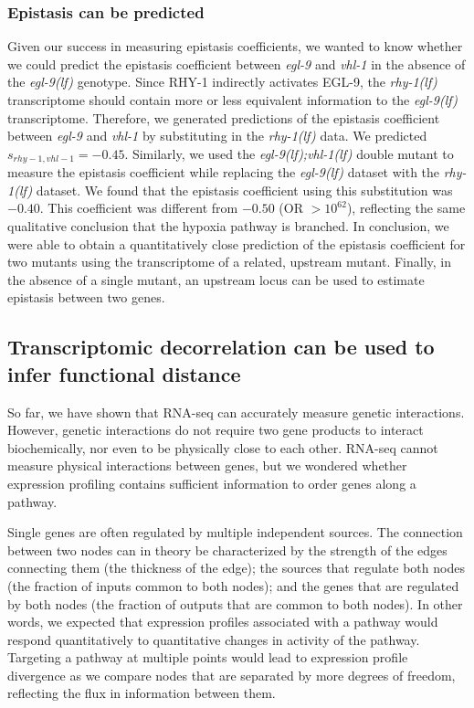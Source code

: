 \documentclass[9pt,twocolumn,twoside]{pnas-new}
\newcommand{\gene}[1]{\mbox{\emph{#1}}}
\newcommand{\egl}{\gene{egl-9(lf)}}
\newcommand{\rhy}{\gene{rhy-1(lf)}}
\newcommand{\eglvhl}{\gene{egl-9(lf);vhl-1(lf)}}
\newcommand{\eglp}{EGL-9}
\newcommand{\rhyp}{RHY-1}
\begin{document}
\subsubsection*{Epistasis can be predicted}
Given our success in measuring epistasis coefficients, we wanted to know whether
we could predict the epistasis coefficient between \gene{egl-9} and \gene{vhl-1}
in the absence of the \egl{} genotype. Since \rhyp{} indirectly activates
\eglp{}, the \rhy{} transcriptome should contain more or less equivalent
information to the \egl{} transcriptome. Therefore, we generated predictions of
the epistasis coefficient between \gene{egl-9} and \gene{vhl-1} by substituting
in the \rhy{} data. We predicted $s_{rhy-1,vhl-1} = -0.45$. Similarly, we used
the \eglvhl{} double mutant to measure the epistasis coefficient while replacing
the \egl{} dataset with the \rhy{} dataset. We found that the epistasis
coefficient using this substitution was $-0.40$. This coefficient was different
from $-0.50$ (OR $>10^{62}$), reflecting the same qualitative conclusion that
the hypoxia pathway is branched. In conclusion, we were able to obtain a
quantitatively close prediction of the epistasis coefficient for two mutants
using the transcriptome of a related, upstream mutant. Finally, in the absence
of a single mutant, an upstream locus can be used to estimate epistasis between
two genes.

\subsection*{Transcriptomic decorrelation can be used to infer functional distance}
\label{sub:decorrelation}
So far, we have shown that RNA-seq can accurately measure genetic interactions.
However, genetic interactions do not require two gene products to interact
biochemically, nor even to be physically close to each other. RNA-seq cannot
measure physical interactions between genes, but we wondered whether expression
profiling contains sufficient information to order genes along a pathway.

Single genes are often regulated by multiple independent sources. The connection
between two nodes can in theory be characterized by the strength of the edges
connecting them (the thickness of the edge); the sources that regulate both
nodes (the fraction of inputs common to both nodes); and the genes that are
regulated by both nodes (the fraction of outputs that are common to both nodes).
In other words, we expected that expression profiles associated with a pathway
would respond quantitatively to quantitative changes in activity of the pathway.
Targeting a pathway at multiple points would lead to expression profile
divergence as we compare nodes that are separated by more degrees of freedom,
reflecting the flux in information between them.
\end{document}
